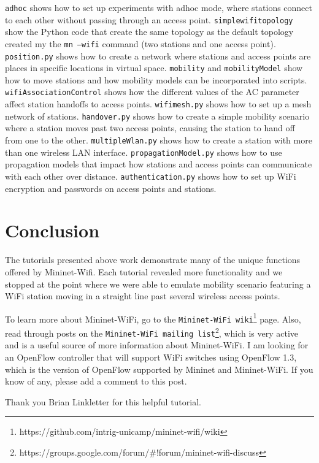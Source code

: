 \texttt{adhoc} shows how to set up experiments with  adhoc mode, where stations connect to each other without passing through an access point.
\texttt{simplewifitopology} show the Python code that create the same topology as the default topology created my the \texttt{mn --wifi} command (two stations and one access point).
\texttt{position.py} shows how to create a network where stations and access points are places in specific locations in virtual space.
\texttt{mobility} and \texttt{mobilityModel} show how to move stations and how mobility models can be incorporated into scripts.
\texttt{wifiAssociationControl} shows how the different values of the AC parameter affect station handoffs to access points.
\texttt{wifimesh.py} shows how to set up a mesh network of stations.
\texttt{handover.py} shows how to create a simple mobility scenario where a station moves past two access points, causing the station to hand off from one to the other. 
\texttt{multipleWlan.py} shows how to create a station with more than one wireless LAN interface.
\texttt{propagationModel.py} shows how to use propagation models that impact how stations and access points can communicate with each other over distance.
\texttt{authentication.py} shows how to set up WiFi encryption and passwords on access points and stations.

\section{Conclusion}

The tutorials presented above work demonstrate many of the unique functions offered by Mininet-Wifi. Each tutorial revealed more functionality and we stopped at the point where we were able to emulate mobility scenario featuring a WiFi station moving in a straight line past several wireless access points. 

To learn more about Mininet-WiFi, go to the \texttt{Mininet-WiFi wiki}\footnote{https://github.com/intrig-unicamp/mininet-wifi/wiki} page. Also, read through posts on the \texttt{Mininet-WiFi mailing list}\footnote{https://groups.google.com/forum/\#!forum/mininet-wifi-discuss}, which is very active and is a useful source of more information about Mininet-WiFi. I am looking for an OpenFlow controller that will support WiFi switches using OpenFlow 1.3, which is the version of OpenFlow supported by Mininet and Mininet-WiFi. If you know of any, please add a comment to this post.

\begin{remark}
Thank you Brian Linkletter for this helpful tutorial.
\end{remark}